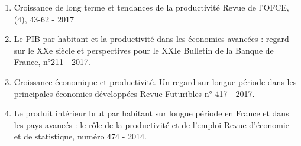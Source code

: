 \documentclass[12pt]{article}
\begin{document}
\begin{footnotesize}
\begin{enumerate}
\item Croissance de long terme et tendances de la productivité Revue de l'OFCE, (4), 43-62 - 2017

\item Le PIB par habitant et la productivité dans les économies avancées : regard sur le XXe siècle et perspectives pour le XXIe Bulletin de la Banque de France, n°211 - 2017.

\item Croissance économique et productivité. Un regard sur longue période dans les principales économies développées Revue Futuribles n° 417 - 2017.

\item Le produit intérieur brut par habitant sur longue période en France et dans les pays avancés : le rôle de la productivité et de l'emploi Revue d'économie et de statistique, numéro 474 - 2014.

\end{enumerate}
\end{footnotesize}
\end{document}
